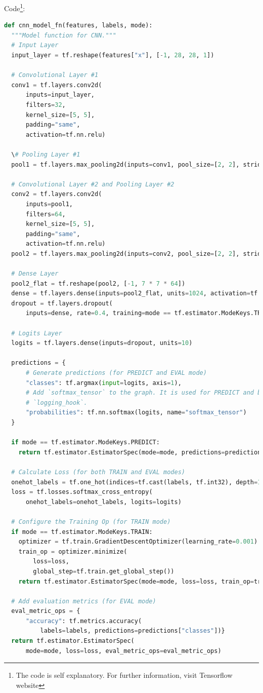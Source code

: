 \documentclass[12pt]{article}
\begin{document}
Code\footnote{The code is self explanatory. For further information, visit Tensorflow website}:
\begin{lstlisting}[language=python]
def cnn_model_fn(features, labels, mode):
  """Model function for CNN."""
  # Input Layer
  input_layer = tf.reshape(features["x"], [-1, 28, 28, 1])

  # Convolutional Layer #1
  conv1 = tf.layers.conv2d(
      inputs=input_layer,
      filters=32,
      kernel_size=[5, 5],
      padding="same",
      activation=tf.nn.relu)

  \# Pooling Layer #1
  pool1 = tf.layers.max_pooling2d(inputs=conv1, pool_size=[2, 2], strides=2)

  # Convolutional Layer #2 and Pooling Layer #2
  conv2 = tf.layers.conv2d(
      inputs=pool1,
      filters=64,
      kernel_size=[5, 5],
      padding="same",
      activation=tf.nn.relu)
  pool2 = tf.layers.max_pooling2d(inputs=conv2, pool_size=[2, 2], strides=2)

  # Dense Layer
  pool2_flat = tf.reshape(pool2, [-1, 7 * 7 * 64])
  dense = tf.layers.dense(inputs=pool2_flat, units=1024, activation=tf.nn.relu)
  dropout = tf.layers.dropout(
      inputs=dense, rate=0.4, training=mode == tf.estimator.ModeKeys.TRAIN)

  # Logits Layer
  logits = tf.layers.dense(inputs=dropout, units=10)

  predictions = {
      # Generate predictions (for PREDICT and EVAL mode)
      "classes": tf.argmax(input=logits, axis=1),
      # Add `softmax_tensor` to the graph. It is used for PREDICT and by the
      # `logging_hook`.
      "probabilities": tf.nn.softmax(logits, name="softmax_tensor")
  }

  if mode == tf.estimator.ModeKeys.PREDICT:
    return tf.estimator.EstimatorSpec(mode=mode, predictions=predictions)

  # Calculate Loss (for both TRAIN and EVAL modes)
  onehot_labels = tf.one_hot(indices=tf.cast(labels, tf.int32), depth=10)
  loss = tf.losses.softmax_cross_entropy(
      onehot_labels=onehot_labels, logits=logits)

  # Configure the Training Op (for TRAIN mode)
  if mode == tf.estimator.ModeKeys.TRAIN:
    optimizer = tf.train.GradientDescentOptimizer(learning_rate=0.001)
    train_op = optimizer.minimize(
        loss=loss,
        global_step=tf.train.get_global_step())
    return tf.estimator.EstimatorSpec(mode=mode, loss=loss, train_op=train_op)

  # Add evaluation metrics (for EVAL mode)
  eval_metric_ops = {
      "accuracy": tf.metrics.accuracy(
          labels=labels, predictions=predictions["classes"])}
  return tf.estimator.EstimatorSpec(
      mode=mode, loss=loss, eval_metric_ops=eval_metric_ops)
\end{lstlisting}
\end{document}

